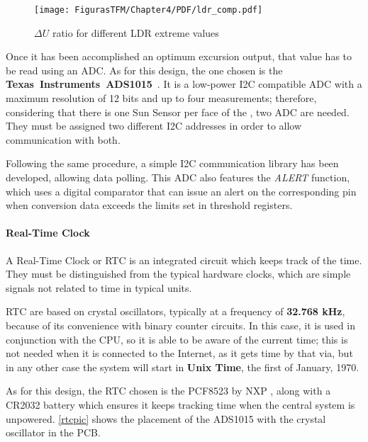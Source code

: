 		\begin{figure} [H]
			\centering
			\texttt{[image: FigurasTFM/Chapter4/PDF/ldr\_comp.pdf]}
			\caption{$\Delta{U}$ ratio for different LDR extreme values}      		\label{ldrcomp}
			\vspace{-1cm}
\end{figure}

Once it has been accomplished an optimum excursion output, that value has to be read using an \acrshort{ADC}. As for this design, the one chosen is the \textbf{Texas~Instruments~ADS1015}~\cite{ads15}. It is a low-power \acrshort{I2C} compatible \acrshort{ADC} with a maximum resolution of 12 bits and up to four measurements; therefore, considering that there is one Sun Sensor per face of the , two \acrshort{ADC} are needed. They must be assigned two different \acrshort{I2C} addresses in order to allow communication with both.

Following the same procedure, a simple \acrshort{I2C} communication library has been developed, allowing data polling. This \acrshort{ADC} also features the \textit{ALERT} function, which uses a digital comparator that can issue an alert on the corresponding pin when conversion data exceeds the limits set in  threshold registers. 

\paragraph{Real-Time Clock}

A Real-Time Clock or \acrshort{RTC} is an integrated circuit which keeps track of the time. They must be distinguished from the typical hardware clocks, which are simple signals not related to time in typical units.

\acrshort{RTC} are based on crystal oscillators, typically at a frequency of \textbf{32.768 kHz}, because of its convenience with binary counter circuits. In this case, it is used in conjunction with the \acrshort{CPU}, so it is able to be aware of the current time; this is not needed when it is connected to the Internet, as it gets time by that via, but in any other case the system will start in \textbf{Unix Time}, the first of January, 1970. 

As for this design, the \acrshort{RTC} chosen is the PCF8523 by NXP \cite{rtcnxp}, along with a CR2032 battery which ensures it keeps tracking time when the central system is unpowered. \autoref{rtcpic} shows the placement of the ADS1015 with the crystal oscillator in the \acrshort{PCB}.

